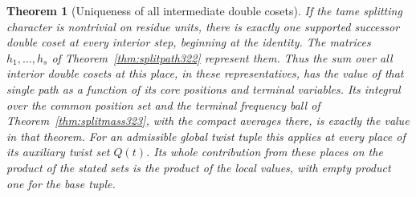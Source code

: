 \documentclass[a4paper,11pt]{article}
\newtheorem{theorem}[proposition]{Theorem}
\theoremstyle{definition}
\theoremstyle{remark}
\numberwithin{equation}{section}
\begin{document}
\begin{theorem}[Uniqueness of all intermediate double cosets]\leavevmode
\label{thm:ramifiedcoset324}
If the tame splitting character is nontrivial on residue
units, there is exactly one supported successor double
coset at every interior step, beginning at the identity.
The matrices \(h_1,\ldots,h_s\) of
Theorem~\ref{thm:splitpath322} represent them. Thus the sum
over all interior double cosets at this place, in these
representatives, has the value of that single path as a
function of its core positions and terminal variables. Its
integral over the common position set and the terminal
frequency ball of Theorem~\ref{thm:splitmass323}, with the
compact averages there, is exactly the value in that theorem.
For an admissible global twist tuple this applies at every
place of its auxiliary twist set \(Q(t)\). Its whole
contribution from these places on the product of the stated
sets is the product of the local values, with empty product
one for the base tuple.
\end{theorem}
\end{document}
